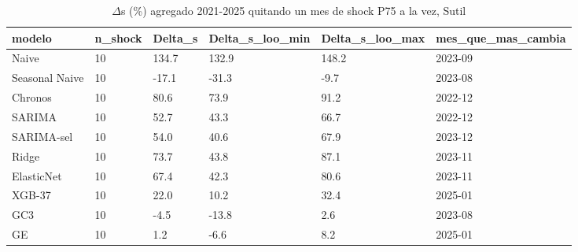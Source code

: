 \begin{table}[H]
\centering
\small
\caption{$\Delta$s (\%) agregado 2021-2025 quitando un mes de shock P75 a la vez, Sutil}
\label{tab:T12_loo_agregado_sutil}
\begin{tabular}{llllll}
\toprule
modelo & n\_shock & Delta\_s & Delta\_s\_loo\_min & Delta\_s\_loo\_max & mes\_que\_mas\_cambia \\
\midrule
Naive & 10 & 134.7 & 132.9 & 148.2 & 2023-09 \\
Seasonal Naive & 10 & -17.1 & -31.3 & -9.7 & 2023-08 \\
Chronos & 10 & 80.6 & 73.9 & 91.2 & 2022-12 \\
SARIMA & 10 & 52.7 & 43.3 & 66.7 & 2022-12 \\
SARIMA-sel & 10 & 54.0 & 40.6 & 67.9 & 2023-12 \\
Ridge & 10 & 73.7 & 43.8 & 87.1 & 2023-11 \\
ElasticNet & 10 & 67.4 & 42.3 & 80.6 & 2023-11 \\
XGB-37 & 10 & 22.0 & 10.2 & 32.4 & 2025-01 \\
GC3 & 10 & -4.5 & -13.8 & 2.6 & 2023-08 \\
GE & 10 & 1.2 & -6.6 & 8.2 & 2025-01 \\
\bottomrule
\end{tabular}
\end{table}
